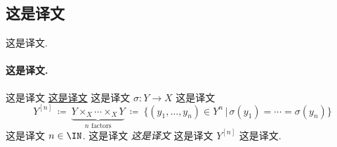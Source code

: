\documentclass[
    affil-it, %
    auth-lg, %
    british, %
    compression, %
    contents, %
    custom-packages={}, %
    references={bigone}, %
]{lib/preprint}
\begin{document}
\begin{body}
        \subsection{这是译文}\label{sec:descentData}
        
这是译文. 
        
        \paragraph{这是译文.}
 这是译文 \uline{这是译文} 这是译文 $\sigma:Y\rightarrow X$ 这是译文         \begin{equation}\label{eq:fibreProducts}
            Y^{[n]}\ \coloneqq\ \underbrace{Y\times_X\cdots\times_XY}_{\text{$n$ factors}}\ \coloneqq\ \{(y_1,\ldots,y_n)\in Y^n\,|\,\sigma(y_1)=\cdots=\sigma(y_n)\}
        \end{equation}  这是译文 $n\in\IN$. 这是译文 \emph{这是译文} 这是译文 $Y^{[n]}$ 这是译文.


\end{body}
\end{document}
